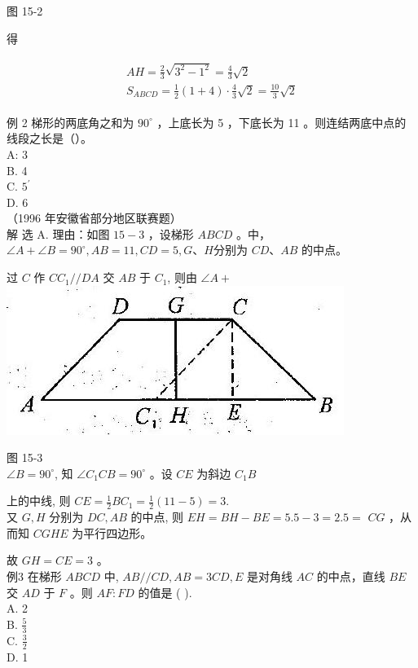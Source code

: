 \documentclass[10pt]{article}
\begin{document}
图 15-2

得

\begin{align*}
\begin{gathered}
A H=\frac{2}{3} \sqrt{3^{2}-1^{2}}=\frac{4}{3} \sqrt{2} \\
S_{A B C D}=\frac{1}{2}(1+4) \cdot \frac{4}{3} \sqrt{2}=\frac{10}{3} \sqrt{2}
\end{gathered}
\end{align*}

例 2 梯形的两底角之和为 $90^{\circ}$ ，上底长为 5 ，下底长为 11 。则连结两底中点的线段之长是（）。\\
A: 3\\
B. 4\\
C. $5^{\prime}$\\
D. 6\\
（1996 年安徽省部分地区联赛题）\\
解 选 A. 理由：如图 $15-3$ ，设梯形 $A B C D$ 。中， $\angle A+\angle B=90^{\circ}, A B=11, C D=5, G 、 H$分别为 $C D 、 A B$ 的中点。

过 $C$ 作 $C C_{1} / / D A$ 交 $A B$ 于 $C_{1}$, 则由 $\angle A+$\\
\includegraphics[max width=\textwidth, center]{2024_10_30_2c8f45efd4a519b08e1ag-138}

图 15-3\\
$\angle B=90^{\circ}$, 知 $\angle C_{1} C B=90^{\circ}$ 。设 $C E$ 为斜边 $C_{1} B$

上的中线, 则 $C E=\frac{1}{2} B C_{1}=\frac{1}{2}(11-5)=3$.\\
又 $G, H$ 分别为 $D C, A B$ 的中点, 则 $E H=B H-B E=5.5-3=2.5=$ $C G$ ，从而知 $C G H E$ 为平行四边形。

故 $G H=C E=3$ 。\\
例3 在梯形 $A B C D$ 中, $A B / / C D, A B=3 C D, E$ 是对角线 $A C$ 的中点，直线 $B E$ 交 $A D$ 于 $F$ 。则 $A F: F D$ 的值是 ( ).\\
A. 2\\
B. $\frac{5}{3}$\\
C. $\frac{3}{2}$\\
D. 1
\end{document}
